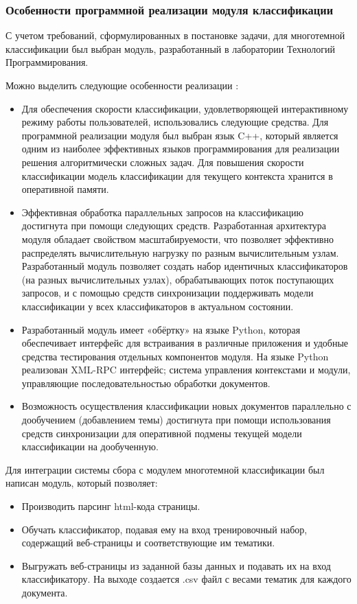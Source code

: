 \documentclass[russian, utf8, emptystyle]{eskdtext}
\begin{document}
\subsubsection{Особенности программной реализации модуля классификации}
С учетом требований, сформулированных в постановке задачи, для многотемной классификации был выбран модуль, разработанный в лаборатории Технологий Программирования.

Можно выделить следующие особенности реализации \cite{dis}:
\begin{itemize}
	\item Для обеспечения скорости классификации, удовлетворяющей интерактивному режиму работы пользователей, использовались следующие средства. Для программной реализации модуля был выбран язык C++, который является одним из наиболее эффективных языков программирования для реализации решения алгоритмически сложных задач. Для повышения скорости классификации модель классификации для текущего контекста хранится в оперативной памяти. 
	\item Эффективная обработка параллельных запросов на классификацию  достигнута при помощи следующих средств. Разработанная архитектура модуля обладает свойством масштабируемости, что позволяет эффективно распределять вычислительную нагрузку по разным вычислительным узлам. Разработанный модуль позволяет создать набор идентичных классификаторов (на разных вычислительных узлах), обрабатывающих поток поступающих запросов, и с помощью средств синхронизации поддерживать модели классификации у всех классификаторов в актуальном состоянии.
	\item Разработанный модуль имеет «обёртку» на языке Python, которая обеспечивает интерфейс для встраивания в различные приложения и удобные средства тестирования отдельных компонентов модуля. На языке Python реализован XML-RPC интерфейс; система управления контекстами и модули, управляющие последовательностью обработки документов.
	\item Возможность осуществления классификации новых документов параллельно с дообучением (добавлением темы)  достигнута при помощи использования средств синхронизации для оперативной подмены текущей модели классификации на дообученную. 
\end{itemize}
Для интеграции системы сбора с модулем многотемной классификации был написан модуль, который позволяет:
\begin{itemize}
\item Производить парсинг html-кода страницы.
\item Обучать классификатор, подавая ему на вход тренировочный набор, содержащий веб-страницы и соответствующие им тематики.
\item Выгружать веб-страницы из заданной базы данных и подавать их на вход классификатору. На выходе создается .csv файл с весами тематик для каждого документа.
\end{itemize}
\end{document}
